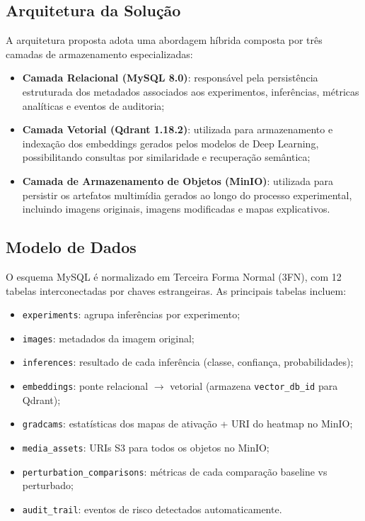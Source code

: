 \documentclass[12pt,a4paper,twoside]{article}
\begin{document}
\subsection{Arquitetura da Solução}

A arquitetura proposta adota uma abordagem híbrida composta por três camadas de armazenamento especializadas:

\begin{itemize}
    \item \textbf{Camada Relacional (MySQL 8.0)}: responsável pela persistência estruturada dos metadados associados aos experimentos, inferências, métricas analíticas e eventos de auditoria;
    \item \textbf{Camada Vetorial (Qdrant 1.18.2)}: utilizada para armazenamento e indexação dos embeddings gerados pelos modelos de Deep Learning, possibilitando consultas por similaridade e recuperação semântica;
    \item \textbf{Camada de Armazenamento de Objetos (MinIO)}: utilizada para persistir os artefatos multimídia gerados ao longo do processo experimental, incluindo imagens originais, imagens modificadas e mapas explicativos.
\end{itemize}

\subsection{Modelo de Dados}

O esquema MySQL é normalizado em Terceira Forma Normal (3FN), com 12 tabelas interconectadas por chaves estrangeiras. As principais tabelas incluem:

\begin{itemize}
    \item \texttt{experiments}: agrupa inferências por experimento;
    \item \texttt{images}: metadados da imagem original;
    \item \texttt{inferences}: resultado de cada inferência (classe, confiança, probabilidades);
    \item \texttt{embeddings}: ponte relacional $\rightarrow$ vetorial (armazena \texttt{vector\_db\_id} para Qdrant);
    \item \texttt{gradcams}: estatísticas dos mapas de ativação + URI do heatmap no MinIO;
    \item \texttt{media\_assets}: URIs S3 para todos os objetos no MinIO;
    \item \texttt{perturbation\_comparisons}: métricas de cada comparação baseline vs perturbado;
    \item \texttt{audit\_trail}: eventos de risco detectados automaticamente.
\end{itemize}
\end{document}
